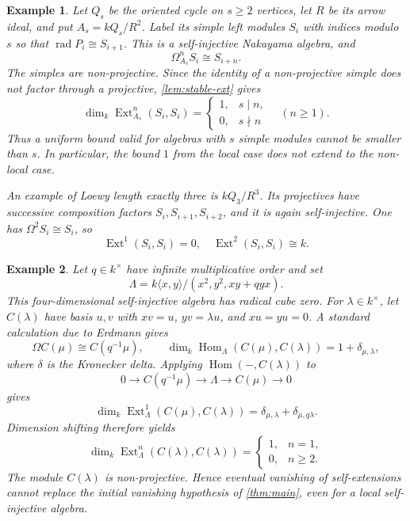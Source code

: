 \documentclass[a4paper,reqno]{amsart}
\numberwithin{equation}{section}
\newtheorem{example}[example]{Example}
\newcommand{\Ext}{\operatorname{Ext}}
\newcommand{\Hom}{\operatorname{Hom}}
\newcommand{\rad}{\operatorname{rad}}
\begin{document}
\begin{example}\label{ex:cycle}
Let $Q_s$ be the oriented cycle on $s\ge2$ vertices, let $R$ be its
arrow ideal, and put $A_s=kQ_s/R^2$. Label its simple left modules
$S_i$ with indices modulo $s$ so that $\rad P_i\cong S_{i+1}$.
This is a self-injective Nakayama algebra, and
\[
 \Omega_{A_s}^nS_i\cong S_{i+n}.
\]
The simples are non-projective. Since the identity of a
non-projective simple does not factor through a projective,
\cref{lem:stable-ext} gives
\[
 \dim_k\Ext_{A_s}^n(S_i,S_i)=
 \begin{cases}1,&s\mid n,\\0,&s\nmid n\end{cases}
 \quad(n\ge1).
\]
Thus a uniform bound valid for algebras with $s$ simple modules
cannot be smaller than $s$. In particular, the bound $1$ from the
local case does not extend to the non-local case.

An example of Loewy length exactly three is $kQ_3/R^3$. Its
projectives have successive composition factors
$S_i,S_{i+1},S_{i+2}$, and it is again self-injective. One has
$\Omega^2S_i\cong S_i$, so
\[
 \Ext^1(S_i,S_i)=0,
 \quad\Ext^2(S_i,S_i)\cong k.
\]
\end{example}

\begin{example}\label{ex:ext-finite}
Let $q\in k^\times$ have infinite multiplicative order and set
\[
 \Lambda=k\langle x,y\rangle/(x^2,y^2,xy+qyx).
\]
This four-dimensional self-injective algebra has radical cube zero.
For $\lambda\in k^\times$, let $C(\lambda)$ have basis $u,v$ with
$xv=u$, $yv=\lambda u$, and $xu=yu=0$. A standard calculation due to Erdmann
\cite[Section~4.1]{Erdmann17} gives
\[
 \Omega C(\mu)\cong C(q^{-1}\mu),\qquad
 \dim_k\Hom_\Lambda(C(\mu),C(\lambda))=1+\delta_{\mu,\lambda},
\]
where $\delta$ is the Kronecker delta. Applying $\Hom(-,C(\lambda))$
to $$0\to C(q^{-1}\mu)\to\Lambda\to C(\mu)\to0$$ gives
\[
 \dim_k\Ext_\Lambda^1(C(\mu),C(\lambda))
 =\delta_{\mu,\lambda}+\delta_{\mu,q\lambda}.
\]
Dimension shifting therefore yields
\[
 \dim_k\Ext_\Lambda^n(C(\lambda),C(\lambda))
 =\begin{cases}1,&n=1,\\0,&n\ge2.\end{cases}
\]
The module $C(\lambda)$ is non-projective. Hence eventual vanishing
of self-extensions cannot replace the initial vanishing hypothesis
of \cref{thm:main}, even for a local self-injective algebra.
\end{example}
\end{document}
